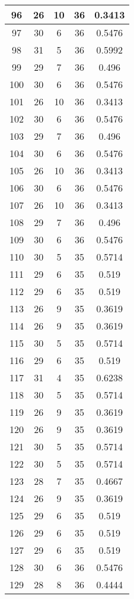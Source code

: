 \documentclass[letterpaper, 12pt]{article}
\begin{document}
\begin{longtable}{|c|c|c|c|c|}
\hline
96 & 26 & 10 & 36 & 0.3413 \\
\hline
97 & 30 & 6 & 36 & 0.5476 \\
\hline
98 & 31 & 5 & 36 & 0.5992 \\
\hline
99 & 29 & 7 & 36 & 0.496 \\
\hline
100 & 30 & 6 & 36 & 0.5476 \\
\hline
101 & 26 & 10 & 36 & 0.3413 \\
\hline
102 & 30 & 6 & 36 & 0.5476 \\
\hline
103 & 29 & 7 & 36 & 0.496 \\
\hline
104 & 30 & 6 & 36 & 0.5476 \\
\hline
105 & 26 & 10 & 36 & 0.3413 \\
\hline
106 & 30 & 6 & 36 & 0.5476 \\
\hline
107 & 26 & 10 & 36 & 0.3413 \\
\hline
108 & 29 & 7 & 36 & 0.496 \\
\hline
109 & 30 & 6 & 36 & 0.5476 \\
\hline
110 & 30 & 5 & 35 & 0.5714 \\
\hline
111 & 29 & 6 & 35 & 0.519 \\
\hline
112 & 29 & 6 & 35 & 0.519 \\
\hline
113 & 26 & 9 & 35 & 0.3619 \\
\hline
114 & 26 & 9 & 35 & 0.3619 \\
\hline
115 & 30 & 5 & 35 & 0.5714 \\
\hline
116 & 29 & 6 & 35 & 0.519 \\
\hline
117 & 31 & 4 & 35 & 0.6238 \\
\hline
118 & 30 & 5 & 35 & 0.5714 \\
\hline
119 & 26 & 9 & 35 & 0.3619 \\
\hline
120 & 26 & 9 & 35 & 0.3619 \\
\hline
121 & 30 & 5 & 35 & 0.5714 \\
\hline
122 & 30 & 5 & 35 & 0.5714 \\
\hline
123 & 28 & 7 & 35 & 0.4667 \\
\hline
124 & 26 & 9 & 35 & 0.3619 \\
\hline
125 & 29 & 6 & 35 & 0.519 \\
\hline
126 & 29 & 6 & 35 & 0.519 \\
\hline
127 & 29 & 6 & 35 & 0.519 \\
\hline
128 & 30 & 6 & 36 & 0.5476 \\
\hline
129 & 28 & 8 & 36 & 0.4444 \\

\end{longtable}
\end{document}
